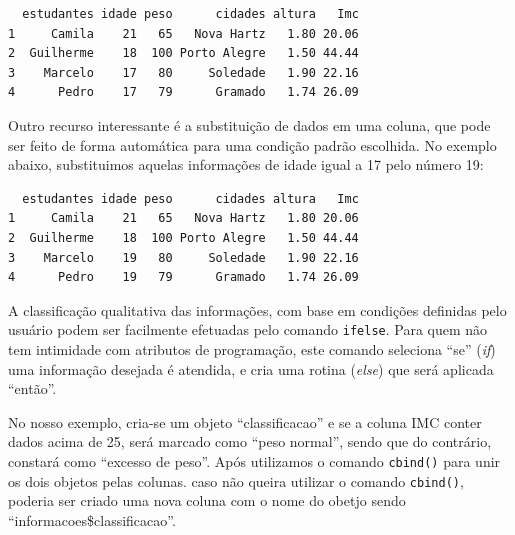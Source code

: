 \documentclass[12pt,portuguese,oneside]{book}
\newenvironment{Shaded}{\begin{snugshade}}{\end{snugshade}}
\newcommand{\KeywordTok}[1]{\textcolor[rgb]{0.13,0.29,0.53}{\textbf{#1}}}
\newcommand{\DecValTok}[1]{\textcolor[rgb]{0.00,0.00,0.81}{#1}}
\newcommand{\StringTok}[1]{\textcolor[rgb]{0.31,0.60,0.02}{#1}}
\newcommand{\CommentTok}[1]{\textcolor[rgb]{0.56,0.35,0.01}{\textit{#1}}}
\newcommand{\OperatorTok}[1]{\textcolor[rgb]{0.81,0.36,0.00}{\textbf{#1}}}
\newcommand{\NormalTok}[1]{#1}
\begin{document}
\begin{verbatim}
  estudantes idade peso      cidades altura   Imc
1     Camila    21   65   Nova Hartz   1.80 20.06
2  Guilherme    18  100 Porto Alegre   1.50 44.44
3    Marcelo    17   80     Soledade   1.90 22.16
4      Pedro    17   79      Gramado   1.74 26.09
\end{verbatim}

Outro recurso interessante é a substituição de dados em uma coluna, que
pode ser feito de forma automática para uma condição padrão escolhida.
No exemplo abaixo, substituimos aquelas informações de idade igual a 17
pelo número 19:

\begin{Shaded}
\end{Shaded}

\begin{verbatim}
  estudantes idade peso      cidades altura   Imc
1     Camila    21   65   Nova Hartz   1.80 20.06
2  Guilherme    18  100 Porto Alegre   1.50 44.44
3    Marcelo    19   80     Soledade   1.90 22.16
4      Pedro    19   79      Gramado   1.74 26.09
\end{verbatim}

A classificação qualitativa das informações, com base em condições
definidas pelo usuário podem ser facilmente efetuadas pelo comando
\texttt{ifelse}. Para quem não tem intimidade com atributos de
programação, este comando seleciona ``se'' (\emph{if}) uma informação
desejada é atendida, e cria uma rotina (\emph{else}) que será aplicada
``então''.

No nosso exemplo, cria-se um objeto ``classificacao'' e se a coluna IMC
conter dados acima de 25, será marcado como ``peso normal'', sendo que
do contrário, constará como ``excesso de peso''. Após utilizamos o
comando \texttt{cbind()} para unir os dois objetos pelas colunas. caso
não queira utilizar o comando \texttt{cbind()}, poderia ser criado uma
nova coluna com o nome do obetjo sendo ``informacoes\$classificacao''.

\begin{Shaded}
\end{Shaded}
\end{document}
